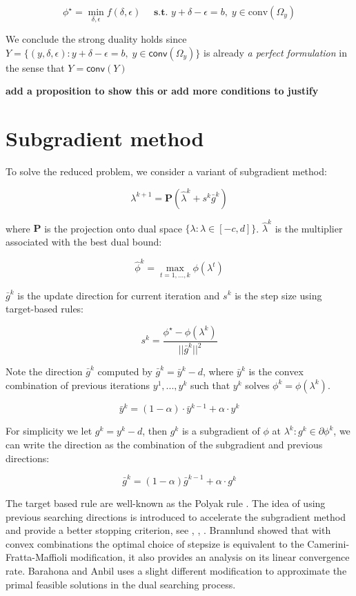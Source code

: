 \documentclass[
  a4paper,
,tablecaptionabove
]{scrartcl}
\numberwithin{equation}{section}
\begin{document}
\[ \phi^\star = \min_{\delta, \epsilon} f(\delta, \epsilon)\quad \textbf{ s.t. }  y + \delta - \epsilon = b,\; y \in \textrm{conv}(\Omega_y)\]

We conclude the strong duality holds since
\(Y = \{(y, \delta, \epsilon): y + \delta - \epsilon = b,\; y \in \textsf{conv}(\Omega_y)\}\)
is already \emph{a perfect formulation} in the sense that
\(Y = \textsf{conv}(Y)\)

\textbf{add a proposition to show this or add more conditions to
  justify}


\hypertarget{subgradient-method}{%
  \section{Subgradient method}\label{subgradient-method}}

To solve the reduced problem, we consider a variant of subgradient
method:

\[\lambda^{k+1} = \mathbf{P}(\hat \lambda^{k} + s^{k}\bar g^{k})\]

where \(\mathbf P\) is the projection onto dual space
\(\{\lambda: \lambda \in [-c, d]\}\). \(\hat \lambda^k\) is the
multiplier associated with the best dual bound:

\[\hat \phi^k = \max_{t=1, ..., k} \phi(\lambda^t)\]

\(\bar g^k\) is the update direction for current iteration and \(s^{k}\)
is the step size using target-based rules:

\[s^{k} = \frac{\phi^\star - \phi(\lambda^k)}{||\bar g^{k}||^2}\]

Note the direction \(\bar g^k\) computed by \(\bar g^k = \bar y^k - d\), where \(\bar y^k\) is the convex combination of previous iterations
\(y^1, ..., y^k\) such that \(y^k\) solves \(\phi^k = \phi(\lambda^k)\).

\[\bar y^k = (1-\alpha)\cdot\bar y^{k-1} + \alpha \cdot y^k \]

For simplicity we let \(g^k= y^k - d\), then \(g^k\) is a subgradient of
\(\phi\) at \(\lambda^k: g^k \in \partial \phi^k\), we can write the direction as the combination of the subgradient and
previous directions:

\[\bar g^k = (1-\alpha) \bar g^{k-1} + \alpha\cdot g^k\]

The target based rule are well-known as the Polyak rule \cite{polyak_general_1967}. The idea of using previous searching directions is introduced to accelerate the subgradient method and provide a better stopping criterion,
see \cite{camerini1975improving}, \cite{brannlund1995generalized}, \cite{barahona_volume_2000}. Brannlund \cite{brannlund1995generalized} showed that
with convex combinations the optimal choice of stepsize is equivalent to the Camerini-Fratta-Maffioli modification, it also provides an analysis on its linear convergence rate.
Barahona and Anbil \cite{barahona_volume_2000} uses a slight different modification to approximate the primal feasible solutions in the dual searching process.
\end{document}
